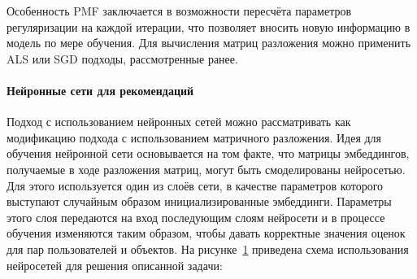 Особенность PMF заключается в возможности пересчёта параметров регуляризации на каждой итерации, что позволяет вносить новую информацию в модель по мере обучения.
Для вычисления матриц разложения можно применить ALS или SGD подходы, рассмотренные ранее.

\pagebreak
\paragraph{Нейронные сети для рекомендаций}

Подход с использованием нейронных сетей можно рассматривать как модификацию подхода с использованием матричного разложения.
Идея для обучения нейронной сети основывается на том факте, что матрицы эмбеддингов, получаемые в ходе разложения матриц, могут быть смоделированы нейросетью.
Для этого используется один из слоёв сети, в качестве параметров которого выступают случайным образом инициализированные эмбеддинги.
Параметры этого слоя передаются на вход последующим слоям нейросети и в процессе обучения изменяются таким образом, чтобы давать корректные значения оценок для пар пользователей и объектов.
На рисунке~\ref{fig:nn_idea} приведена схема использования нейросетей для решения описанной задачи:

\begin{figure}[h!]
\caption{}
\label{fig:nn_idea}
\end{figure}

